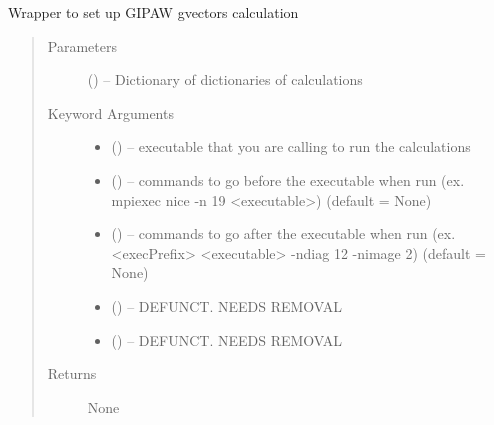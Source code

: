 \documentclass[letterpaper,10pt,english]{sphinxmanual}
\begin{document}
\begin{fulllineitems}
\label{\detokenize{run:run.gvectors}}
Wrapper to set up GIPAW gvectors calculation
\begin{quote}\begin{description}
\item[{Parameters}] \leavevmode
{} () -- Dictionary of dictionaries of calculations

\item[{Keyword Arguments}] \leavevmode\begin{itemize}
\item {} 
 () -- executable that you are calling to run the calculations

\item {} 
 () -- commands to go before the executable when run
(ex. mpiexec nice -n 19 \textless{}executable\textgreater{}) (default = None)

\item {} 
 () -- commands to go after the executable when run
(ex. \textless{}execPrefix\textgreater{} \textless{}executable\textgreater{} -ndiag 12 -nimage 2) (default = None)

\item {} 
 () -- DEFUNCT. NEEDS REMOVAL

\item {} 
 () -- DEFUNCT. NEEDS REMOVAL

\end{itemize}

\item[{Returns}] \leavevmode
None

\end{description}\end{quote}

\end{fulllineitems}

\end{document}
